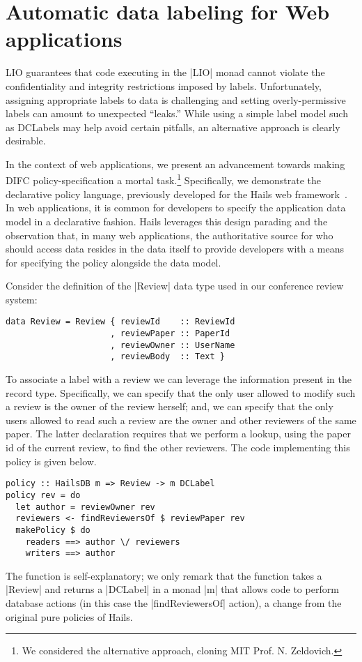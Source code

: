 \section{Automatic data labeling for Web applications}

LIO guarantees that code executing in the \hs|LIO| monad cannot
violate the confidentiality and integrity restrictions imposed by
labels.
%
Unfortunately, assigning appropriate labels to data is challenging and
setting overly-permissive labels can amount to unexpected ``leaks.''
%
While using a simple label model such as DCLabels may help avoid
certain pitfalls, an alternative approach is clearly desirable.

In the context of web applications, we present an advancement towards
making DIFC policy-specification a mortal task.\footnote{
  We considered the alternative approach, cloning MIT Prof.
  N. Zeldovich.
}
%
Specifically, we demonstrate the declarative policy language, previously
developed for the Hails web framework~\cite{hails}.
%
In web applications, it is common for developers to specify the
application data model in a declarative fashion.
%
Hails leverages this design parading and the observation that, in many
web applications, the authoritative source for who should access data
resides in the data itself to provide developers with a means for
specifying the policy alongside the data model.
%

Consider the definition of the \hs|Review| data type used in our
conference review system:
\begin{verbatim}
data Review = Review { reviewId    :: ReviewId
                     , reviewPaper :: PaperId
                     , reviewOwner :: UserName
                     , reviewBody  :: Text }
\end{verbatim}
To associate a label with a review we can leverage the 
information present in the record type.
%
Specifically, we can specify that the only user allowed to modify such
a review is the owner of the review herself; and, we can specify that
the only users allowed to read such a review are the owner and other
reviewers of the same paper.
%
The latter declaration requires that we perform a lookup, using the
paper id of the current review, to find the other reviewers.
%
The code implementing this policy is given below.
%
\begin{verbatim}
policy :: HailsDB m => Review -> m DCLabel
policy rev = do
  let author = reviewOwner rev
  reviewers <- findReviewersOf $ reviewPaper rev
  makePolicy $ do
    readers ==> author \/ reviewers
    writers ==> author
\end{verbatim}
%
The function is self-explanatory; we only remark that the function
takes a \hs|Review| and returns a \hs|DCLabel| in a monad \hs|m| that
allows code to perform database actions (in this case the
\hs|findReviewersOf| action), a change from the original pure policies
of Hails.
%

